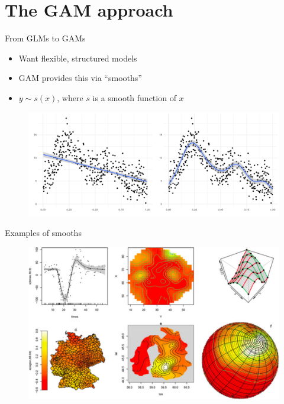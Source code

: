 \documentclass{beamer}
\begin{document}
\section{The GAM approach}

\begin{frame}{From GLMs to GAMs}
  \begin{itemize}
    \item Want flexible, structured models
    \item GAM provides this via ``smooths''
    \item $y \sim s(x)$, where $s$ is a smooth function of $x$
  \end{itemize}
  \begin{figure}[h]
    \begin{center}
      \includegraphics[width=\textwidth]{figures/lmorsmooth.pdf}
    \end{center}
  \end{figure}
\end{frame}


\begin{frame}{Examples of smooths}
  \begin{figure}[h]
    \begin{center}
      \includegraphics[width=\textwidth]{figures/smooths.png}
    \end{center}
  \end{figure}
\end{frame}
\end{document}
